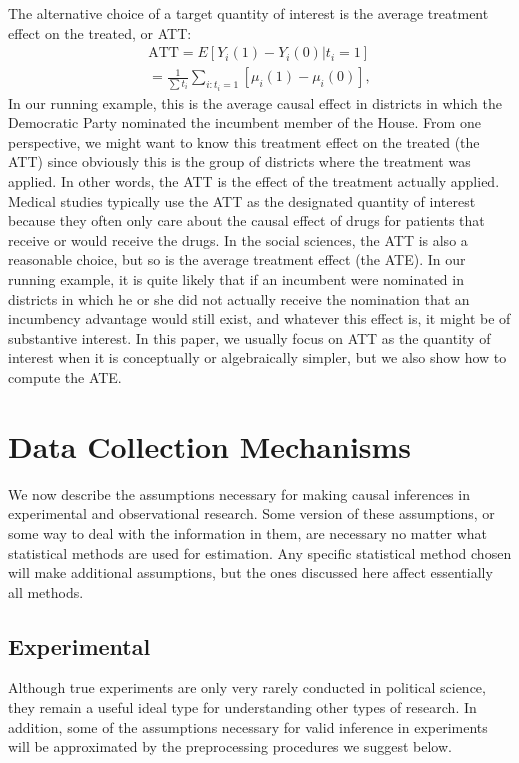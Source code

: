 \documentclass[11pt,titlepage]{article}
\begin{document}
The alternative choice of a target quantity of interest is the average
treatment effect on the treated, or ATT:
\begin{align}
  \label{att}
  \text{ATT} = E[Y_i(1) - Y_i(0)|t_i=1] \\
             = \frac{1}{\sum t_i}\sum_{i:t_i=1}[\mu_i(1) - \mu_i(0)],
\end{align}
In our running example, this is the average causal effect in districts
in which the Democratic Party nominated the incumbent member of the
House.  From one perspective, we might want to know this treatment
effect on the treated (the ATT) since obviously this is the group of
districts where the treatment was applied.  In other words, the ATT is
the effect of the treatment actually applied.  Medical studies
typically use the ATT as the designated quantity of interest because
they often only care about the causal effect of drugs for patients
that receive or would receive the drugs.  In the social sciences, the
ATT is also a reasonable choice, but so is the average treatment
effect (the ATE).  In our running example, it is quite likely that if
an incumbent were nominated in districts in which he or she did not
actually receive the nomination that an incumbency advantage would
still exist, and whatever this effect is, it might be of substantive
interest.  In this paper, we usually focus on ATT as the quantity of
interest when it is conceptually or algebraically simpler, but we also
show how to compute the ATE.

\section{Data Collection Mechanisms}

We now describe the assumptions necessary for making causal inferences
in experimental and observational research.  Some version of these
assumptions, or some way to deal with the information in them, are
necessary no matter what statistical methods are used for estimation.
Any specific statistical method chosen will make additional
assumptions, but the ones discussed here affect essentially all
methods.

\subsection{Experimental}

Although true experiments are only very rarely conducted in political
science, they remain a useful ideal type for understanding other types
of research.  In addition, some of the assumptions necessary for valid
inference in experiments will be approximated by the preprocessing
procedures we suggest below.
\end{document}
